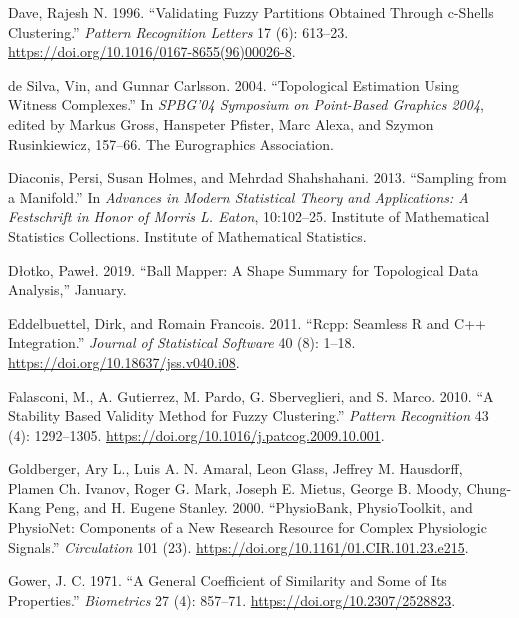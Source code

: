 \documentclass{article}
\newlength{\cslhangindent}
\newlength{\cslentryspacingunit} %
\newenvironment{CSLReferences}[2] %
 {%
  \setlength{\parindent}{0pt}
  \ifodd #1
  \let\oldpar\par
  \def\par{\hangindent=\cslhangindent\oldpar}
  \fi
  \setlength{\parskip}{#2\cslentryspacingunit}
 }%
 {}
\begin{document}
\begin{CSLReferences}{1}{0}
\leavevmode{}%
Dave, Rajesh N. 1996. {``Validating Fuzzy Partitions Obtained Through
c-Shells Clustering.''} \emph{Pattern Recognition Letters} 17 (6):
613--23. \url{https://doi.org/10.1016/0167-8655(96)00026-8}.

\leavevmode{}%
de Silva, Vin, and Gunnar Carlsson. 2004. {``Topological Estimation
Using Witness Complexes.''} In \emph{{SPBG}'04 {Symposium} on
{Point-Based Graphics} 2004}, edited by Markus Gross, Hanspeter Pfister,
Marc Alexa, and Szymon Rusinkiewicz, 157--66. {The Eurographics
Association}.

\leavevmode{}%
Diaconis, Persi, Susan Holmes, and Mehrdad Shahshahani. 2013.
{``Sampling from a {Manifold}.''} In \emph{Advances in {Modern
Statistical Theory} and {Applications}: {A Festschrift} in Honor of
{Morris L}. {Eaton}}, 10:102--25. Institute of {Mathematical Statistics
Collections}. {Institute of Mathematical Statistics}.

\leavevmode{}%
Dłotko, Paweł. 2019. {``Ball Mapper: A Shape Summary for Topological
Data Analysis,''} January.

\leavevmode{}%
Eddelbuettel, Dirk, and Romain Francois. 2011. {``Rcpp: {Seamless R} and
{C}++ {Integration}.''} \emph{Journal of Statistical Software} 40 (8):
1--18. \url{https://doi.org/10.18637/jss.v040.i08}.

\leavevmode{}%
Falasconi, M., A. Gutierrez, M. Pardo, G. Sberveglieri, and S. Marco.
2010. {``A Stability Based Validity Method for Fuzzy Clustering.''}
\emph{Pattern Recognition} 43 (4): 1292--1305.
\url{https://doi.org/10.1016/j.patcog.2009.10.001}.

\leavevmode{}%
Goldberger, Ary L., Luis A. N. Amaral, Leon Glass, Jeffrey M. Hausdorff,
Plamen Ch. Ivanov, Roger G. Mark, Joseph E. Mietus, George B. Moody,
Chung-Kang Peng, and H. Eugene Stanley. 2000. {``{PhysioBank},
{PhysioToolkit}, and {PhysioNet}: {Components} of a {New Research
Resource} for {Complex Physiologic Signals}.''} \emph{Circulation} 101
(23). \url{https://doi.org/10.1161/01.CIR.101.23.e215}.

\leavevmode{}%
Gower, J. C. 1971. {``A {General Coefficient} of {Similarity} and {Some}
of {Its Properties}.''} \emph{Biometrics} 27 (4): 857--71.
\url{https://doi.org/10.2307/2528823}.


\end{CSLReferences}
\end{document}
